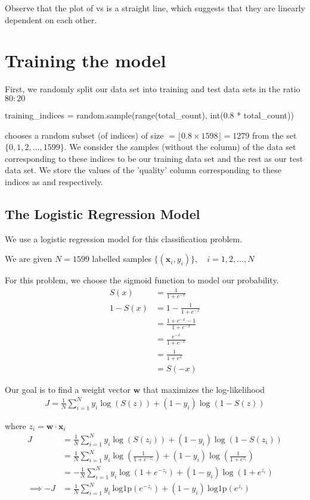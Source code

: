 \documentclass[journal,12pt,onecolumn]{IEEEtran}
\let\vec\mathbf
\providecommand{\brak}[1]{\ensuremath{\left(#1\right)}}
\begin{document}
	Observe that the plot of  vs  is a straight line, which suggests that they are linearly dependent on each other.
	\pagebreak
	
	\section{Training the model}
	First, we randomly split our data set into training and test data sets in the ratio $80:20$
	\begin{python}
	training_indices = random.sample(range(total_count), int(0.8 * total_count)) \end{python}
	 chooses a random subset (of indices) of size $= \lfloor 0.8 \times 1598 \rfloor = 1279$ from the set $\{0, 1, 2, \ldots, 1599 \}$. We consider the samples (without the  column) of the data set corresponding to these indices to be our training data set and the rest as our test data set. We store the values of the 'quality' column corresponding to these indices as  and  respectively.
	
	\subsection*{The Logistic Regression Model}
	We use a logistic regression model for this classification problem.	 
	
	We are given $N = 1599$ labelled samples $\{(\vec{x}_i, y_i)\}, \quad i = 1,2,\ldots,N$
	
	For this problem, we choose the sigmoid function to model our probability.
	\begin{align}
		S(x) &= \frac{1}{1 + e^{-x}} \\
		1 - S(x) &= 1 - \frac{1}{1 + e^{-x}} \\
		&= \frac{1 + e^{-x} - 1}{1 + e^{-x}} \\
		&= \frac{e^{-x}}{1 + e^{-x}} \\
		&= \frac{1}{1 + e^{x}} \\
		&= S(-x)
	\end{align}
	
	Our goal is to find a weight vector $\vec{w}$ that maximizes the log-likelihood
	\begin{align}
		J = \frac{1}{N} \sum_{i=1}^N y_i \log (S(z)) + (1 - y_i) \log (1 - S(z))
	\end{align}
	
	where $z_i = \vec{w} \cdot \vec{x}_i$
	\begin{align}
		J &= \frac{1}{N} \sum_{i=1}^N y_i \log (S(z_i)) + (1 - y_i) \log (1 - S(z_i)) \\
		&= \frac{1}{N} \sum_{i=1}^N y_i \log \brak{\frac{1}{1 + e^{-z_i}}} + (1 - y_i) \log \brak{\frac{1}{1 + e^{z_i}}} \\
		&= -\frac{1}{N} \sum_{i=1}^N y_i \log \brak{1 + e^{-z_i}} + (1 - y_i) \log \brak{1 + e^{z_i}} \\
		\implies -J &=  \frac{1}{N} \sum_{i=1}^N y_i ~ \mathrm{log1p} \brak{e^{-z_i}} + (1 - y_i) ~ \mathrm{log1p} \brak{e^{z_i}} \\
	\end{align}
	
\end{document}
